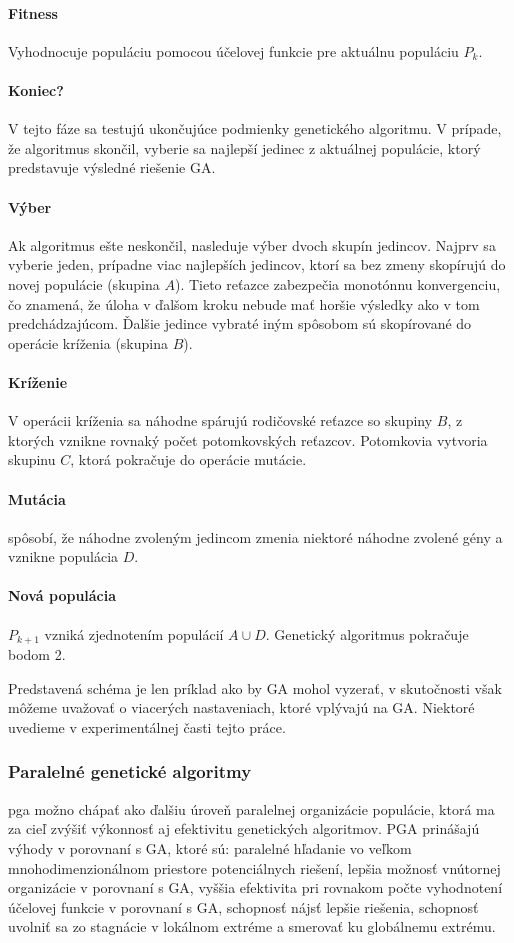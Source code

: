 \paragraph{Fitness} Vyhodnocuje populáciu pomocou účelovej funkcie pre aktuálnu populáciu $ P_k $.
\paragraph{Koniec?} V tejto fáze sa testujú ukončujúce podmienky genetického algoritmu.
V prípade, že algoritmus skončil, vyberie sa najlepší jedinec z aktuálnej populácie, ktorý predstavuje výsledné riešenie GA.
\paragraph{Výber} Ak algoritmus ešte neskončil, nasleduje výber dvoch skupín jedincov. Najprv sa vyberie jeden, prípadne viac najlepších jedincov, ktorí sa bez zmeny skopírujú
do novej populácie (skupina $ A $). Tieto reťazce zabezpečia monotónnu konvergenciu, čo znamená, že úloha v ďalšom kroku nebude mať horšie výsledky ako v tom predchádzajúcom.
Ďalšie jedince vybraté iným spôsobom sú skopírované do operácie kríženia (skupina $ B $).
\paragraph{Kríženie} V operácii kríženia sa náhodne spárujú rodičovské reťazce so skupiny $ B $, z ktorých vznikne rovnaký počet potomkovských reťazcov.
Potomkovia vytvoria skupinu $ C $, ktorá pokračuje do operácie mutácie. 
\paragraph{Mutácia} spôsobí, že náhodne zvoleným jedincom zmenia niektoré náhodne zvolené gény a vznikne populácia $ D $.
\paragraph{Nová populácia} $ P_{k+1} $ vzniká zjednotením populácií $ A \cup D $. Genetický algoritmus pokračuje bodom 2.
  
Predstavená schéma je len príklad ako by GA mohol vyzerať, v skutočnosti však môžeme uvažovať o viacerých nastaveniach, ktoré vplývajú na GA.
Niektoré uvedieme v experimentálnej časti tejto práce.

\subsubsection{Paralelné genetické algoritmy}
\acrfull{pga} možno chápať ako ďalšiu úroveň paralelnej organizácie populácie, ktorá ma za cieľ zvýšiť výkonnosť aj efektivitu genetických algoritmov.
PGA prinášajú výhody v porovnaní s GA, ktoré sú: paralelné hľadanie vo veľkom mnohodimenzionálnom priestore potenciálnych riešení, lepšia možnosť vnútornej organizácie v porovnaní s GA, vyššia efektivita pri rovnakom počte vyhodnotení účelovej funkcie v porovnaní s GA, schopnosť nájsť lepšie riešenia, schopnosť uvolniť sa zo stagnácie v lokálnom extréme a smerovať ku globálnemu extrému.

